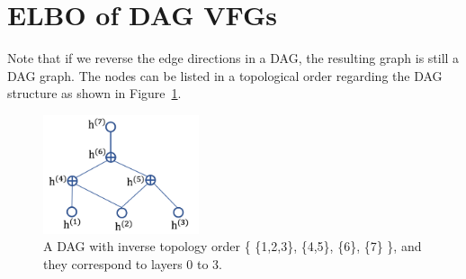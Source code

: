 \documentclass[sigconf, anonymous, review]{acmart}
\theoremstyle{plain}
\theoremstyle{definition}
\theoremstyle{remark}
\begin{document}





\section{ELBO of DAG VFGs}\label{appd:dag_elbo}
Note that if we reverse the edge directions in a DAG, the resulting graph is still a DAG graph.  
The nodes can be listed in a topological order regarding the DAG structure as shown in Figure~\ref{fig:dag}. 

\begin{figure}[H]
    \centering
    \includegraphics[width=1.8in]{fig/dag.png}
    \caption{A DAG  with inverse topology order \big\{ \{1,2,3\}, \{4,5\}, \{6\},  \{7\} \big\}, and they  correspond to layers 0 to 3.  }
    \label{fig:dag}
\end{figure}
\end{document}
